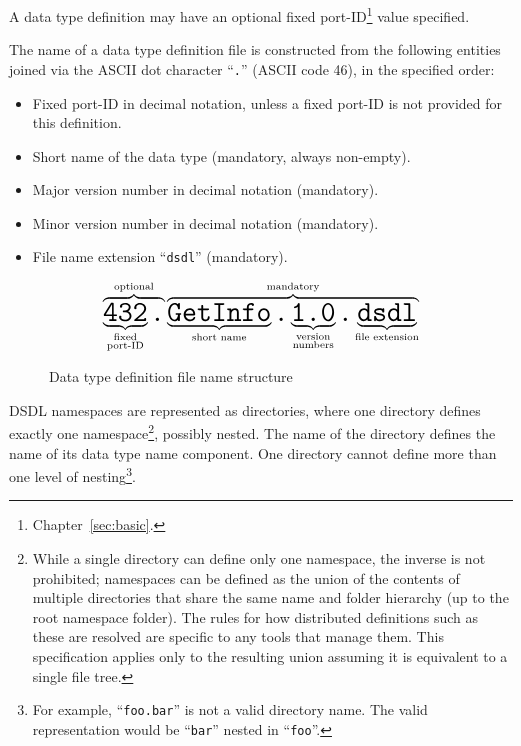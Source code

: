 A data type definition may have an optional fixed port-ID\footnote{Chapter~\ref{sec:basic}.} value specified.

The name of a data type definition file is constructed from the following entities
joined via the ASCII dot character ``\verb|.|'' (ASCII code 46), in the specified order:
\begin{itemize}
    \item Fixed port-ID in decimal notation, unless a fixed port-ID is not provided for this definition.
    \item Short name of the data type (mandatory, always non-empty).
    \item Major version number in decimal notation (mandatory).
    \item Minor version number in decimal notation (mandatory).
    \item File name extension ``\verb|dsdl|'' (mandatory).
\end{itemize}

\begin{figure}[H]
    $$
    \overbrace{%
        \underbrace{\texttt{\huge{432}}}_{\substack{\text{fixed} \\ \text{port-ID}}}%
        \texttt{\huge{.}}%
    }^{\text{optional}}%
    \overbrace{%
        \underbrace{\texttt{\huge{GetInfo}}}_{\substack{\text{short name}}}%
        \texttt{\huge{.}}%
        \underbrace{\texttt{\huge{1.0}}}_{\substack{\text{version} \\ \text{numbers}}}%
        \texttt{\huge{.}}%
        \underbrace{\texttt{\huge{dsdl}}}_{\text{file extension}}%
    }^{\text{mandatory}}
    $$
    \caption{Data type definition file name structure\label{fig:dsdl_definition_file_name_structure}}
\end{figure}

DSDL namespaces are represented as directories, where one directory defines exactly one namespace\footnote{%
    While a single directory can define only one namespace, the inverse is not prohibited; namespaces can be
    defined as the union of the contents of multiple directories that share the same name and folder hierarchy (up to
    the root namespace folder). The rules for how distributed definitions such as these are resolved are specific to any 
    tools that manage them. This specification applies only to the resulting union assuming it is equivalent to a single
    file tree.
}, possibly nested.
The name of the directory defines the name of its data type name component.
One directory cannot define more than one level of
nesting\footnote{%
    For example, ``\texttt{foo.bar}'' is not a valid directory name.
    The valid representation would be ``\texttt{bar}'' nested in ``\texttt{foo}''.
}.

